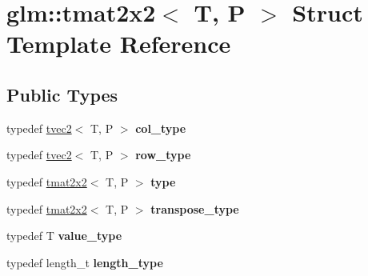 \hypertarget{structglm_1_1tmat2x2}{}\section{glm\+:\+:tmat2x2$<$ T, P $>$ Struct Template Reference}
\label{structglm_1_1tmat2x2}
\subsection*{Public Types}
\begin{DoxyCompactItemize}
\item 
\mbox{\label{structglm_1_1tmat2x2_a9e4690f52926b475b36ed5f6209f22f4}} 
typedef \hyperlink{structglm_1_1tvec2}{tvec2}$<$ T, P $>$ {\bfseries col\+\_\+type}
\item 
\mbox{\label{structglm_1_1tmat2x2_ae47fdac58575c6c061ef9af82d342367}} 
typedef \hyperlink{structglm_1_1tvec2}{tvec2}$<$ T, P $>$ {\bfseries row\+\_\+type}
\item 
\mbox{\label{structglm_1_1tmat2x2_ab558dcd4da9d21b6c5c5681ec536d6e1}} 
typedef \hyperlink{structglm_1_1tmat2x2}{tmat2x2}$<$ T, P $>$ {\bfseries type}
\item 
\mbox{\label{structglm_1_1tmat2x2_af3fafee9ef3082f4a2aa80cc25ce5b36}} 
typedef \hyperlink{structglm_1_1tmat2x2}{tmat2x2}$<$ T, P $>$ {\bfseries transpose\+\_\+type}
\item 
\mbox{\label{structglm_1_1tmat2x2_aeac2c876456c92309d99f949824710b5}} 
typedef T {\bfseries value\+\_\+type}
\item 
\mbox{\label{structglm_1_1tmat2x2_a89bfd406715f8c3ae1c1f503d640fbb6}} 
typedef length\+\_\+t {\bfseries length\+\_\+type}
\end{DoxyCompactItemize}
